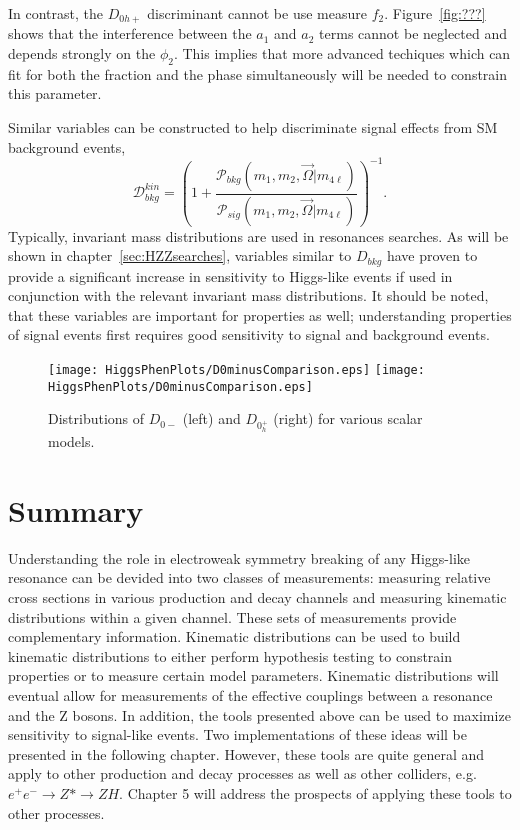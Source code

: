In contrast, the $D_{0h+}$ discriminant cannot be use measure $f_2$.  
Figure~\ref{fig:???} shows that the interference between the $a_1$
and $a_2$ terms cannot be neglected and depends strongly on the $\phi_2$.
This implies that more advanced techiques which can fit for both the
fraction and the phase simultaneously will be needed to constrain this parameter.

Similar variables can be constructed to help discriminate signal effects 
from SM background events,
\begin{equation}
\mathscr{D}^{kin}_{bkg} = \left(1+\frac{\mathscr{P}_{bkg}(m_1,m_2,\vec{\Omega}|m_{4\ell})}{\mathscr{P}_{sig}(m_1,m_2,\vec{\Omega}|m_{4\ell})}\right)^{-1}.
\label{eq:Dbkg}
\end{equation}
Typically, invariant mass distributions are used in resonances searches. 
As will be shown in chapter~\ref{sec:HZZsearches}, variables similar to 
$D_{bkg}$ have proven to provide a significant increase in sensitivity to 
Higgs-like events if used in conjunction with the relevant invariant
mass distributions.  It should be noted, that these variables are important
for properties as well; understanding properties of signal events first
requires good sensitivity to signal and background events.  

\begin{figure}
\begin{center}
\texttt{[image: HiggsPhenPlots/D0minusComparison.eps]}
\texttt{[image: HiggsPhenPlots/D0minusComparison.eps]}
\caption{Distributions of $D_{0-}$ (left) and $D_{0_h^+}$ (right) for 
various scalar models.}
\label{fig:fa3Comparison}
\end{center}
\end{figure}

\section{Summary}

Understanding the role in electroweak symmetry breaking of any 
Higgs-like resonance can be devided into two classes of
measurements: measuring relative cross sections in various 
production and decay channels and measuring kinematic distributions
within a given channel.  These sets of measurements provide
complementary information.  Kinematic distributions can be used
to build kinematic distributions to either perform hypothesis 
testing to constrain properties or to measure certain model
parameters.  Kinematic distributions will eventual
allow for measurements of the effective couplings between a 
resonance and the Z bosons. In addition, the tools presented above
can be used to maximize sensitivity to signal-like events.
Two implementations of these ideas will be presented in the 
following chapter. However, these tools are quite general and 
apply to other production and decay processes as well as other 
colliders, e.g. $e^+e^-\to Z*\to ZH$.  Chapter 5 will address 
the prospects of applying these tools to other processes.  

